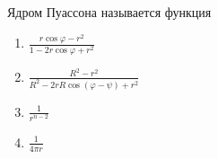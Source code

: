 Ядром Пуассона называется функция

\begin{enumerate}[label=\arabic*)]
    \item \(\frac{r\cos \varphi -r^2}{1-2r\cos \varphi +r^2}\)
    \item \(\frac{R^2-r^2}{R^2-2rR\cos \left(\varphi -\psi \right)+r^2}\)
    \item \(\frac{1}{r^{n-2}}\)
    \item \(\frac{1}{4\pi r}\)
\end{enumerate}

